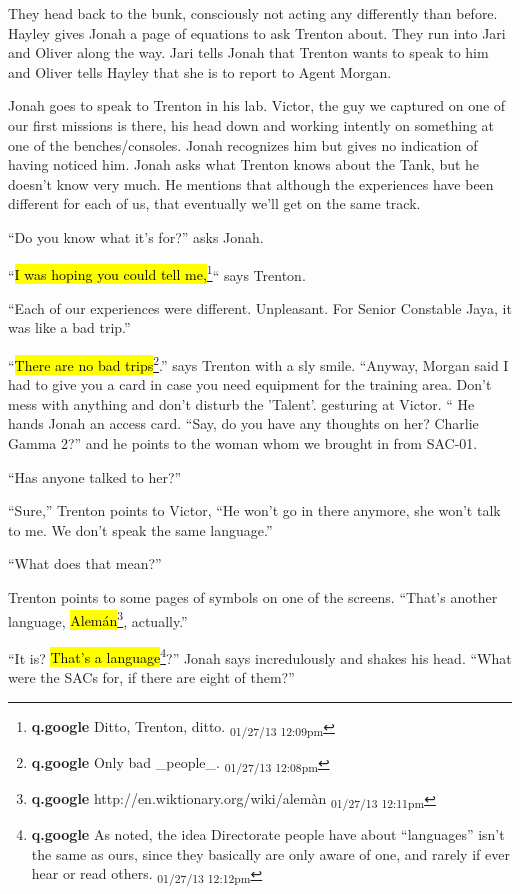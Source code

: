 They head back to the bunk, consciously not acting any differently than before.  Hayley gives Jonah a page of equations to ask Trenton about.  They run into Jari and Oliver along the way.  Jari tells Jonah that Trenton wants to speak to him and Oliver tells Hayley that she is to report to Agent Morgan.



Jonah goes to speak to Trenton in his lab.  Victor, the guy we captured on one of our first missions is there, his head down and working intently on something at one of the benches/consoles.  Jonah recognizes him but gives no indication of having noticed him.  Jonah asks what Trenton knows about the Tank, but he doesn't know very much.  He mentions that although the experiences have been different for each of us, that eventually we'll get on the same track.

``Do you know what it's for?'' asks Jonah.

``\hl{I was hoping you could tell me,}\footnote{\textbf{q.google }Ditto, Trenton, ditto. \textsubscript{01/27/13 12:09pm}}`` says Trenton.

``Each of our experiences were different.  Unpleasant.  For Senior Constable Jaya, it was like a bad trip.''

``\hl{There are no bad trips}\footnote{\textbf{q.google }Only bad \_people\_. \textsubscript{01/27/13 12:08pm}}.'' says Trenton with a sly smile.  ``Anyway, Morgan said I had to give you a card in case you need equipment for the training area.  Don't mess with anything and don't disturb the 'Talent'. gesturing at Victor. `` He hands Jonah an access card.  ``Say, do you have any thoughts on her? Charlie Gamma 2?'' and he points to the woman whom we brought in from SAC-01.

``Has anyone talked to her?''

``Sure,'' Trenton points to Victor, ``He won't go in there anymore, she won't talk to me.  We don't speak the same language.''

``What does that mean?''

Trenton points to some pages of symbols on one of the screens.  ``That's another language, \hl{Alemán}\footnote{\textbf{q.google }http://en.wiktionary.org/wiki/alem\`an \textsubscript{01/27/13 12:11pm}}, actually.''

``It is?  \hl{That's a language}\footnote{\textbf{q.google }As noted, the idea Directorate people have about ``languages'' isn't the same as ours, since they basically are only aware of one, and rarely if ever hear or read others. \textsubscript{01/27/13 12:12pm}}?'' Jonah says incredulously and shakes his head.  ``What were the SACs for, if there are eight of them?''

